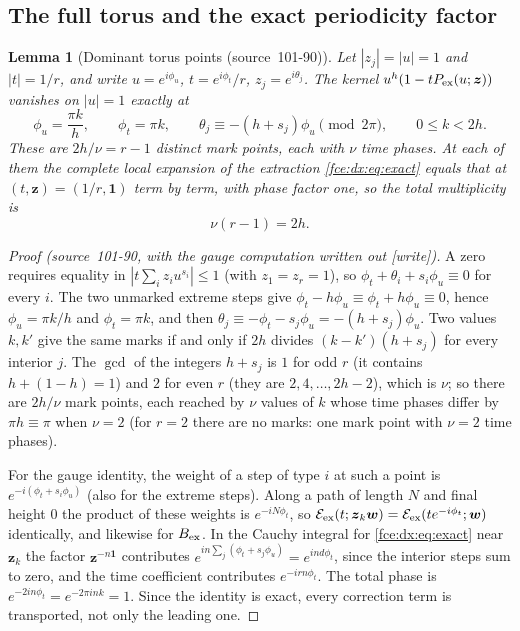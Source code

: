 \documentclass[11pt,a4paper]{article}
\numberwithin{equation}{section}
\newtheorem{lemma}[theorem]{Lemma}
\theoremstyle{definition}\newtheorem{definition}[theorem]{Definition}
\theoremstyle{remark}\newtheorem{remark}[theorem]{Remark}
\newcommand{\E}{\mathcal E}
\newcommand{\one}{\boldsymbol 1}
\begin{document}
\subsection{The full torus and the exact periodicity factor}\label{fce:dx:sec:torus}
\begin{lemma}[Dominant torus points (source~101-90)]\label{fce:dx:lem:torus}
Let $|z_j|=|u|=1$ and $|t|=1/r$, and write $u=e^{i\phi_u}$,
$t=e^{i\phi_t}/r$, $z_j=e^{i\theta_j}$. The kernel
$u^h(1-tP_{\rm ex}(u;\boldsymbol z))$ vanishes on $|u|=1$ exactly at
\begin{equation}\label{fce:dx:eq:phases}
 \phi_u=\frac{\pi k}h,\qquad \phi_t=\pi k,\qquad
 \theta_j\equiv-(h+s_j)\phi_u\pmod{2\pi},\qquad 0\le k<2h.
\end{equation}
These are $2h/\nu=r-1$ distinct mark points, each with $\nu$ time phases.
At each of them the complete local expansion of the extraction
\eqref{fce:dx:eq:exact} equals that at $(t,\boldsymbol z)=(1/r,\one)$ term
by term, with phase factor one, so the total multiplicity is
\begin{equation}\label{fce:dx:eq:copies}
 \nu(r-1)=2h .
\end{equation}
\end{lemma}
\begin{proof}[Proof (source~101-90, with the gauge computation written out \textup{[write]})]
A zero requires equality in $|t\sum_iz_iu^{s_i}|\le1$ (with $z_1=z_r=1$), so
$\phi_t+\theta_i+s_i\phi_u\equiv0$ for every $i$. The two unmarked extreme
steps give $\phi_t-h\phi_u\equiv\phi_t+h\phi_u\equiv0$, hence
$\phi_u=\pi k/h$ and $\phi_t=\pi k$, and then
$\theta_j\equiv-\phi_t-s_j\phi_u=-(h+s_j)\phi_u$. Two values $k,k'$ give the
same marks if and only if $2h$ divides $(k-k')(h+s_j)$ for every interior $j$. The
$\gcd$ of the integers $h+s_j$ is $1$ for odd $r$ (it contains
$h+(1-h)=1$) and $2$ for even $r$ (they are $2,4,\ldots,2h-2$), which is
$\nu$; so there are $2h/\nu$ mark points, each reached by $\nu$ values of $k$
whose time phases differ by $\pi h\equiv\pi$ when $\nu=2$ (for $r=2$ there
are no marks: one mark point with $\nu=2$ time phases).

For the gauge identity, the weight of a step of type $i$ at such a point is
$e^{-i(\phi_t+s_i\phi_u)}$ (also for the extreme steps). Along a path of
length $N$ and final height $0$ the product of these weights is
$e^{-iN\phi_t}$, so
$\E_{\rm ex}(t;\boldsymbol z_k\boldsymbol w)=\E_{\rm ex}(te^{-i\phi_t};\boldsymbol w)$
identically, and likewise for $B_{\rm ex}$. In the Cauchy integral for
\eqref{fce:dx:eq:exact} near $\boldsymbol z_k$ the factor
$\boldsymbol z^{-n\one}$ contributes
$e^{in\sum_j(\phi_t+s_j\phi_u)}=e^{ind\phi_t}$, since the interior steps sum
to zero, and the time coefficient contributes $e^{-irn\phi_t}$. The total
phase is $e^{-2in\phi_t}=e^{-2\pi ink}=1$. Since the identity is exact, every
correction term is transported, not only the leading one.
\end{proof}
\end{document}
